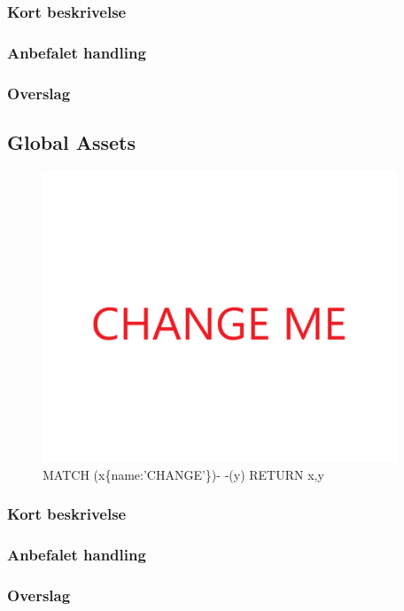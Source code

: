 \documentclass{article}
\begin{document}
\subsubsection{Kort beskrivelse}
\subsubsection{Anbefalet handling}
\subsubsection{Overslag}
\subsection{Global Assets}
\begin{figure}[h]
\includegraphics[width=300pt]{CHANGE.PNG}
\caption{MATCH (x\{name:'CHANGE'\})- -(y) RETURN x,y}
\end{figure}
\subsubsection{Kort beskrivelse}
\subsubsection{Anbefalet handling}
\subsubsection{Overslag}
\end{document}

